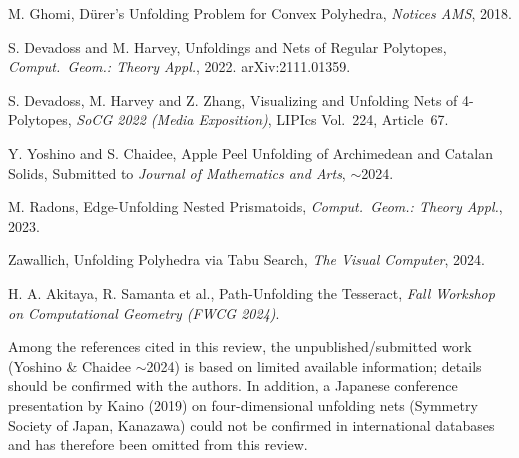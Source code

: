 \documentclass[a4paper,11pt]{article}
\begin{document}
\begin{enumerate}[label={[\arabic*]}, leftmargin=2em]
  \item M. Ghomi, D\"{u}rer's Unfolding Problem for Convex Polyhedra,
        \textit{Notices AMS}, 2018.
  \item S. Devadoss and M. Harvey, Unfoldings and Nets of Regular Polytopes,
        \textit{Comput.\ Geom.: Theory Appl.}, 2022. arXiv:2111.01359.
  \item S. Devadoss, M. Harvey and Z. Zhang, Visualizing and Unfolding Nets of 4-Polytopes,
        \textit{SoCG 2022 (Media Exposition)}, LIPIcs Vol.~224, Article~67.
  \item Y. Yoshino and S. Chaidee, Apple Peel Unfolding of Archimedean and Catalan Solids,
        Submitted to \textit{Journal of Mathematics and Arts}, $\sim$2024.
  \item M. Radons, Edge-Unfolding Nested Prismatoids,
        \textit{Comput.\ Geom.: Theory Appl.}, 2023.
  \item Zawallich, Unfolding Polyhedra via Tabu Search,
        \textit{The Visual Computer}, 2024.
  \item H. A. Akitaya, R. Samanta et al., Path-Unfolding the Tesseract,
        \textit{Fall Workshop on Computational Geometry (FWCG 2024)}.
\end{enumerate}

\bigskip
\noindent\small
Among the references cited in this review, the unpublished/submitted work
(Yoshino \& Chaidee $\sim$2024) is based on limited available information;
details should be confirmed with the authors.
In addition, a Japanese conference presentation by Kaino (2019) on four-dimensional
unfolding nets (Symmetry Society of Japan, Kanazawa) could not be confirmed in
international databases and has therefore been omitted from this review.
\end{document}
